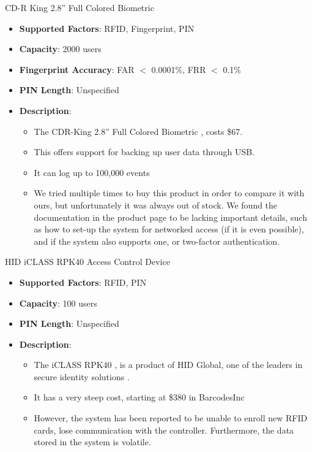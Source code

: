 \begin{frame}{CD-R King 2.8'' Full Colored Biometric}
\begin{itemize}
    \item<1-> \textbf{Supported Factors}: RFID, Fingerprint, PIN 
    \item<2-> \textbf{Capacity}: 2000 users
    \item<3-> \textbf{Fingerprint Accuracy}: FAR $<$ 0.0001\%, FRR $<$ 0.1\%
    \item<4-> \textbf{PIN Length}: Unspecified
    \item<5-> \textbf{Description}:
    \begin{itemize}
	    \item<6-> \scriptsize{The CDR-King 2.8'' Full Colored Biometric , costs \$67.}
	    \item<7-> \scriptsize{This offers support for backing up user data through USB.}
	    \item<8-> \scriptsize{It can log up to 100,000 events}
	    \item<9-> \scriptsize{We tried multiple times to buy this product in order to compare it with ours, but unfortunately it was always out of stock. We found the documentation in the product page to be lacking important details, such as how to set-up the system for networked access (if it is even possible), and if the system also supports one, or two-factor authentication.} 
	\end{itemize}
\end{itemize}
\end{frame}

\begin{frame}{HID iCLASS RPK40 Access Control Device}
\begin{itemize}
    \item<1-> \textbf{Supported Factors}: RFID, PIN
    \item<2-> \textbf{Capacity}: 100 users
    \item<3-> \textbf{PIN Length}: Unspecified
    \item<4-> \textbf{Description}:
    \begin{itemize}
	    \item<6-> \scriptsize{The iCLASS RPK40 , is a product of HID Global, one of the leaders in secure identity solutions .}
	    \item<7-> \scriptsize{It has a very steep cost, starting at \$380 in BarcodesInc }
	    \item<8-> \scriptsize{However, the system has been reported to be unable to enroll new RFID cards, lose communication with the controller. Furthermore, the data stored in the system is volatile.} 
	\end{itemize}
\end{itemize}
\end{frame}

